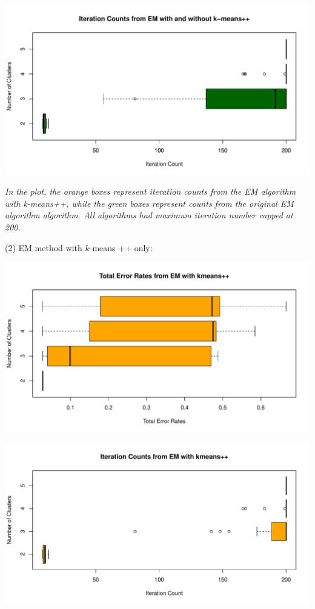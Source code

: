 \documentclass[a4paper,12pt]{article}
\newcommand{\km}{$k$-means }
\begin{document}
\begin{center}
  \includegraphics[width=0.9\linewidth]{Image/ProbEC1-ItrCount-Ringnorm-Both.pdf}
  
   \parbox{0.9\textwidth}{\textit{In the plot, the \textcolor{myorange}{orange boxes} represent iteration counts from the EM algorithm with k-means++, while the \textcolor{mydarkgreen}{green boxes} represent counts from the original EM algorithm algorithm. 
   All algorithms had maximum iteration number capped at 200.
  }}
\end{center}
\bigskip

\noindent (2) EM method with \km++ only:
\begin{center}
  \includegraphics[width=0.8\linewidth]{Image/ProbEC1-TotalErr-Ringnorm-EMkpp.pdf}
\end{center}
\begin{center}
  \includegraphics[width=0.8\linewidth]{Image/ProbEC1-ItrCount-Ringnorm-EMkpp.pdf}
\end{center}
\bigskip
\end{document}
